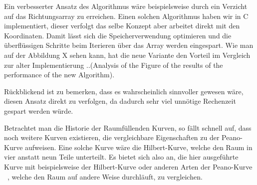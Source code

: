 \documentclass[course=asp]{aspdoc}
\begin{document}
Ein verbesserter Ansatz des Algorithmus w\"are beispielsweise durch ein Verzicht auf das Richtungsarray zu erreichen. Einen solchen Algorithmus haben wir in C implementiert, dieser verfolgt das selbe Konzept aber arbeitet direkt mit den Koordinaten. Damit l\"asst sich die Speicherverwendung optimieren und die \"uberfl\"ussigen Schritte beim Iterieren \"uber das Array werden eingespart. Wie man auf der Abbildung X sehen kann, hat die neue Variante den Vorteil im Vergleich zur alter Implementierung ..(Analysis of the Figure of the results of the performance of the new Algorithm).

R\"uckblickend ist zu bemerken, dass es wahrscheinlich sinnvoller gewesen w\"are, diesen Ansatz direkt zu verfolgen, da dadurch sehr viel unn\"otige Rechenzeit gespart werden w\"urde.

Betrachtet man die Historie der Raumf\"ullenden Kurven, so f\"allt schnell auf, dass noch weitere Kurven existieren, die vergleichbare Eigenschaften zu der Peano-Kurve aufweisen. Eine solche Kurve w\"are die Hilbert-Kurve, welche den Raum in vier anstatt neun Teile unterteilt. Es bietet sich also an, die hier ausgef\"uhrte Kurve mit beispielsweise der Hilbert-Kurve oder anderen Arten der Peano-Kurve ~\cite{raumKurven}, welche den Raum auf andere Weise durchl\"auft, zu vergleichen.


\newpage

{}
\end{document}
